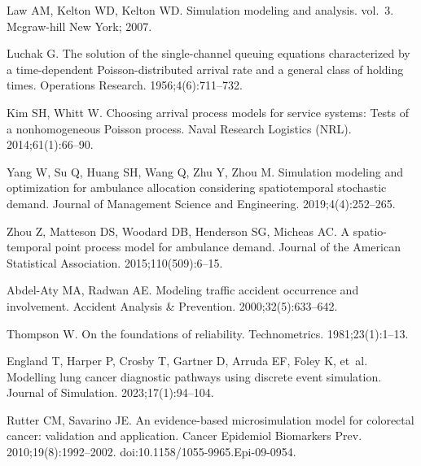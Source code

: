 \documentclass[10pt,letterpaper]{article}
\begin{document}
%
%
% 
\begin{thebibliography}{10}

Law AM, Kelton WD, Kelton WD.
\newblock Simulation modeling and analysis. vol.~3.
\newblock Mcgraw-hill New York; 2007.

Luchak G.
\newblock The solution of the single-channel queuing equations characterized by a time-dependent Poisson-distributed arrival rate and a general class of holding times.
\newblock Operations Research. 1956;4(6):711--732.

Kim SH, Whitt W.
\newblock Choosing arrival process models for service systems: Tests of a nonhomogeneous Poisson process.
\newblock Naval Research Logistics (NRL). 2014;61(1):66--90.

Yang W, Su Q, Huang SH, Wang Q, Zhu Y, Zhou M.
\newblock Simulation modeling and optimization for ambulance allocation considering spatiotemporal stochastic demand.
\newblock Journal of Management Science and Engineering. 2019;4(4):252--265.

Zhou Z, Matteson DS, Woodard DB, Henderson SG, Micheas AC.
\newblock A spatio-temporal point process model for ambulance demand.
\newblock Journal of the American Statistical Association. 2015;110(509):6--15.

Abdel-Aty MA, Radwan AE.
\newblock Modeling traffic accident occurrence and involvement.
\newblock Accident Analysis \& Prevention. 2000;32(5):633--642.

Thompson W.
\newblock On the foundations of reliability.
\newblock Technometrics. 1981;23(1):1--13.

England T, Harper P, Crosby T, Gartner D, Arruda EF, Foley K, et~al.
\newblock Modelling lung cancer diagnostic pathways using discrete event simulation.
\newblock Journal of Simulation. 2023;17(1):94--104.

Rutter CM, Savarino JE.
\newblock An evidence-based microsimulation model for colorectal cancer: validation and application.
\newblock Cancer Epidemiol Biomarkers Prev. 2010;19(8):1992--2002.
\newblock doi:{10.1158/1055-9965.Epi-09-0954}.


\end{thebibliography}
\end{document}
